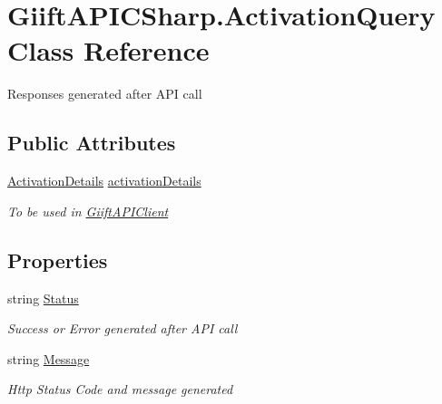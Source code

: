 \hypertarget{class_giift_a_p_i_c_sharp_1_1_activation_query}{}\section{Giift\+A\+P\+I\+C\+Sharp.\+Activation\+Query Class Reference}
\label{class_giift_a_p_i_c_sharp_1_1_activation_query}


Responses generated after A\+PI call  


\subsection*{Public Attributes}
\begin{DoxyCompactItemize}
\item 
\hyperlink{class_giift_a_p_i_c_sharp_1_1_activation_details}{Activation\+Details} \hyperlink{class_giift_a_p_i_c_sharp_1_1_activation_query_a8ce4b723c075d0d7ef067d3abb3c05a7}{activation\+Details}
\begin{DoxyCompactList}\small\item\em To be used in \hyperlink{class_giift_a_p_i_c_sharp_1_1_giift_a_p_i_client}{Giift\+A\+P\+I\+Client} \end{DoxyCompactList}\end{DoxyCompactItemize}
\subsection*{Properties}
\begin{DoxyCompactItemize}
\item 
string \hyperlink{class_giift_a_p_i_c_sharp_1_1_activation_query_ab811b360a3ccb4bbcaabe33aaac00bc4}{Status}
\begin{DoxyCompactList}\small\item\em Success or Error generated after A\+PI call \end{DoxyCompactList}\item 
string \hyperlink{class_giift_a_p_i_c_sharp_1_1_activation_query_a0df1bfb065e06e9d4c07eedbd5a9ae93}{Message}
\begin{DoxyCompactList}\small\item\em Http Status Code and message generated \end{DoxyCompactList}\end{DoxyCompactItemize}



